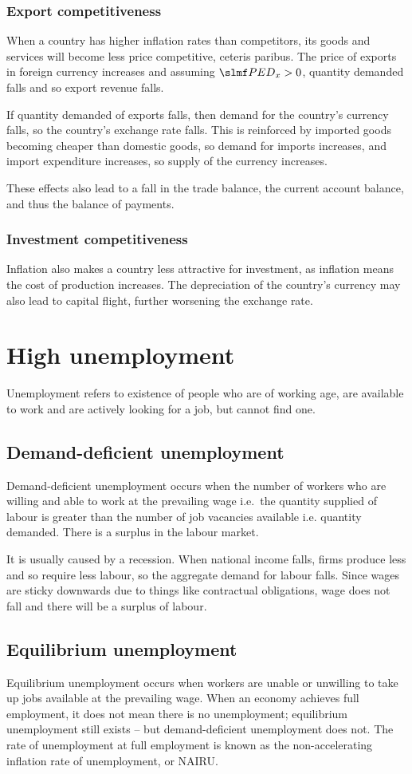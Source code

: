 \documentclass[Economics.tex]{subfiles}
\begin{document}
\subsubsection{Export competitiveness}
When a country has higher inflation rates than competitors, its goods and services will become less price competitive, ceteris paribus. The price of exports in foreign currency increases and assuming \(\PEDx{} > 0\), quantity demanded falls and so export revenue falls.

If quantity demanded of exports falls, then demand for the country's currency falls, so the country's exchange rate falls. This is reinforced by imported goods becoming cheaper than domestic goods, so demand for imports increases, and import expenditure increases, so supply of the currency increases.

These effects also lead to a fall in the trade balance, the current account balance, and thus the balance of payments.
\subsubsection{Investment competitiveness}
Inflation also makes a country less attractive for investment, as inflation means the cost of production increases. The depreciation of the country's currency may also lead to capital flight, further worsening the exchange rate.
\section{High unemployment}
Unemployment refers to existence of people who are of working age, are available to work and are actively looking for a job, but cannot find one.
\subsection{Demand-deficient unemployment}
Demand-deficient unemployment occurs when the number of workers who are willing and able to work at the prevailing wage i.e.\ the quantity supplied of labour is greater than the number of job vacancies available i.e. quantity demanded. There is a surplus in the labour market.

It is usually caused by a recession. When national income falls, firms produce less and so require less labour, so the aggregate demand for labour falls. Since wages are sticky downwards due to things like contractual obligations, wage does not fall and there will be a surplus of labour.
\subsection{Equilibrium unemployment}
Equilibrium unemployment occurs when workers are unable or unwilling to take up jobs available at the prevailing wage. When an economy achieves full employment, it does not mean there is no unemployment; equilibrium unemployment still exists -- but demand-deficient unemployment does not. The rate of unemployment at full employment is known as the non-accelerating inflation rate of unemployment, or NAIRU.
\end{document}
